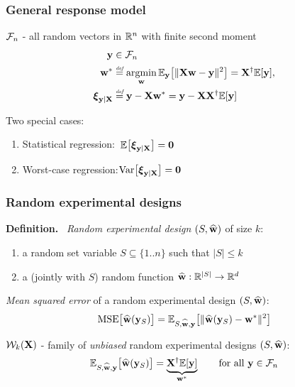 \documentclass{beamer}
\begin{document}
\begin{frame}
  \frametitle{General response model}
  $\mathcal{F}_n$ - all random vectors in $\mathbb R^n$ with finite second moment
  \pause
  \begin{align*}
    \mathbf y&\in\mathcal{F}_n
\\  \mathbf w^*&\stackrel{\textit{\tiny{def}}}{=}  \operatorname*{\mathop{\mathrm{argmin}}}_\mathbf w \mathbb E_\mathbf y \big[\|\mathbf X\mathbf w-\mathbf y\|^2\big]
    =\mathbf X^\dagger\mathbb E[\mathbf y],
\\ \boldsymbol\xi_{\mathbf y|\mathbf X}&\stackrel{\textit{\tiny{def}}}{=} \mathbf y-\mathbf X\mathbf w^* = \mathbf y-\mathbf X\mathbf X^\dagger\mathbb E[\mathbf y]
  \end{align*}
  \pause\vspace{3mm}

Two special cases:\vspace{2mm}
\pause
\begin{enumerate}
\item Statistical regression:\quad\quad\  $\mathbb E\big[\boldsymbol\xi_{\mathbf y|\mathbf X}\big]=\mathbf 0$
  \pause
\item Worst-case regression:\quad $\mathrm{Var}\big[\boldsymbol\xi_{\mathbf y|\mathbf X}\big]=\mathbf 0$
\end{enumerate}

\end{frame}

\begin{frame}
  \frametitle{Random experimental designs}
  \textbf{Definition.} \ \textit{Random experimental design}
  $(S,\widehat{\mathbf w})$ of size $k$:
  \begin{enumerate}
    \item a random set variable $S\subseteq \{1..n\}$ such that
      $|S|\leq k$
    \item a (jointly with $S$) random function $\widehat{\mathbf w}:\mathbb R^{|S|}\rightarrow\mathbb R^d$
    \end{enumerate}
    \pause\vspace{6mm}
    
    \textit{Mean squared error} of a random experimental design
    $(S,\widehat{\mathbf w})$:
    \begin{align*}
      {\mathrm{MSE}\big[\widehat{\mathbf w}(\mathbf y_S)\big]} = \mathbb E_{S,\widehat{\mathbf w},\mathbf y}\big[\|\widehat{\mathbf w}(\mathbf y_S)-\mathbf w^*\|^2\big]
    \end{align*}
    \pause\vspace{3mm}

$\mathcal{W}_k(\mathbf X)$ - family of \textit{unbiased} random experimental designs $(S,\widehat{\mathbf w})$:
    \begin{align*}
      \mathbb E_{S,\widehat{\mathbf w},\mathbf y}\big[\widehat{\mathbf w}(\mathbf y_S)\big] = \underbrace{\mathbf X^\dagger\mathbb E[\mathbf y]}_{\mathbf w^*}
      \qquad \text{for all }\mathbf y\in\mathcal{F}_n
    \end{align*}
  \end{frame}
\end{document}
